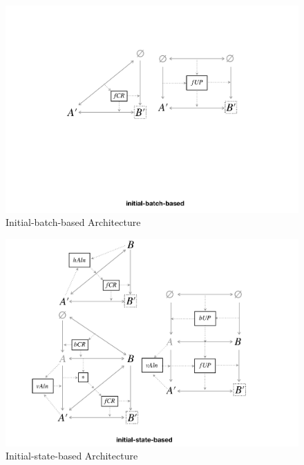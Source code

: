 \begin{figure}[tb!]
	\centering
	\includegraphics[width=0.8\columnwidth]{diagrams/foundations//initial-batch-based}
	\caption{Initial-batch-based Architecture}
	\label{fig:initialBatchBased}
\end{figure}

\begin{figure}[tb!]
	\centering
	\includegraphics[width=\columnwidth]{diagrams/foundations//initial-state-based}
	\caption{Initial-state-based Architecture}
	\label{fig:initialStateBased}
\end{figure}

